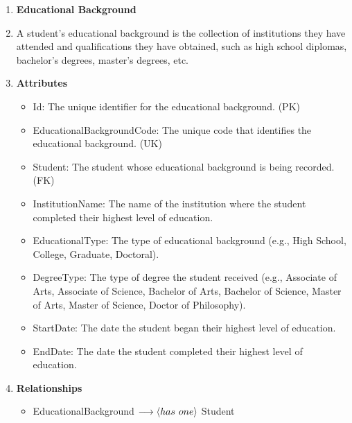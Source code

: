 \documentclass[12pt]{article}
\begin{document}
\begin{appendices}
\begin{enumerate}[label=(\roman*)]
    \item \textbf{Educational Background}
    \item[] A student's educational background is the collection of institutions they have attended and qualifications they have obtained, such as high school diplomas, bachelor's degrees, master's degrees, etc.
    \item[] \textbf{Attributes}
    \begin{itemize}
        \item Id: The unique identifier for the educational background. (PK)
        \item EducationalBackgroundCode: The unique code that identifies the educational background. (UK)
        \item Student: The student whose educational background is being recorded. (FK)
        \item InstitutionName: The name of the institution where the student completed their highest level of education.
        \item EducationalType: The type of educational background (e.g., High School, College, Graduate, Doctoral).
        \item DegreeType: The type of degree the student received (e.g., Associate of Arts, Associate of Science, Bachelor of Arts, Bachelor of Science, Master of Arts, Master of Science, Doctor of Philosophy).
        \item StartDate: The date the student began their highest level of education.
        \item EndDate: The date the student completed their highest level of education.
    \end{itemize}
    \item[] \textbf{Relationships}
    \begin{itemize}
        \item EducationalBackground $ \longrightarrow \langle has \hspace{0.125cm} one \rangle $ Student
    \end{itemize}


\end{enumerate}
\end{appendices}
\end{document}
